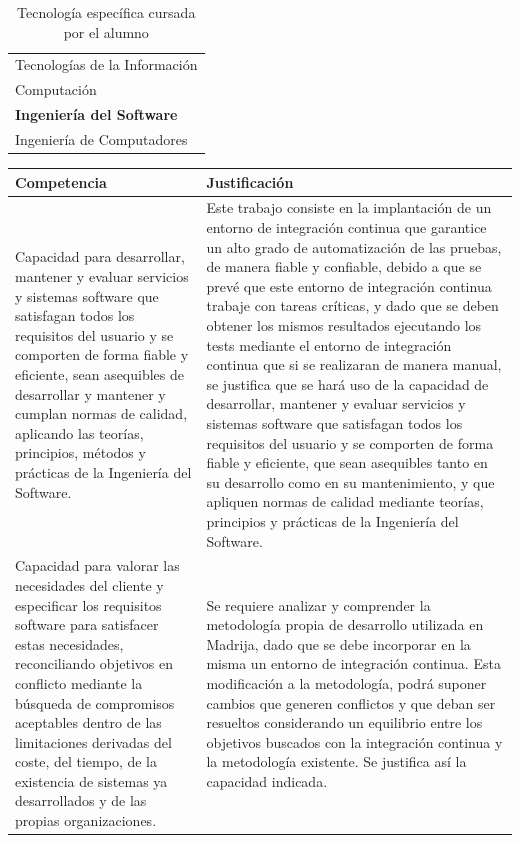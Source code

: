 \documentclass{pre-tfg}
\begin{document}
\begin{table}[hp]
  \centering
  \label{tab:tec-especifica}
  \begin{tabular}{p{}}
    \hline
    Tecnologías de la Información \\
    Computación \\
    \rowcolor{yellow} \textbf{Ingeniería del Software} \\
    Ingeniería de Computadores \\
    \hline
  \end{tabular}
    \caption{Tecnología específica cursada por el alumno}
\end{table}
\newpage
\begin{center}
\begin{longtable}{p{} p{}}
\hline \hline
  \textbf{Competencia} & \textbf{Justificación} \\
    \hline \hline
    Capacidad para desarrollar, mantener y evaluar servicios y sistemas software que satisfagan todos los requisitos del usuario y se comporten de forma fiable y eficiente, sean asequibles de desarrollar y mantener y cumplan normas de calidad, aplicando las teorías, principios, métodos y prácticas de la Ingeniería del Software. & Este trabajo consiste en la implantación de un entorno de integración continua que garantice un alto grado de automatización de las pruebas, de manera fiable y confiable, debido a que se prevé que este entorno de integración continua trabaje con tareas críticas, y dado que se deben obtener los mismos resultados ejecutando los tests mediante el entorno de integración continua que si se realizaran de manera manual, se justifica que se hará uso de la capacidad de desarrollar, mantener y evaluar servicios y sistemas software que satisfagan todos los requisitos del usuario y se comporten de forma fiable y eficiente, que sean asequibles tanto en su desarrollo como en su mantenimiento, y que apliquen normas de calidad mediante teorías, principios y prácticas de la Ingeniería del Software.\\
    \hline\hline
    Capacidad para valorar las necesidades del cliente y especificar los requisitos software para satisfacer estas necesidades, reconciliando objetivos en conflicto mediante la búsqueda de compromisos aceptables dentro de las limitaciones derivadas del coste, del tiempo, de la existencia de sistemas ya desarrollados y de las propias organizaciones. & Se requiere analizar y comprender la metodología propia de desarrollo utilizada en Madrija, dado que se debe incorporar en la misma un entorno de integración continua. Esta modificación a la metodología, podrá suponer cambios que generen conflictos y que deban ser resueltos considerando un equilibrio entre los objetivos buscados con la integración continua y la metodología existente. Se justifica así la capacidad indicada.\\

\end{longtable}
\end{center}
\end{document}
